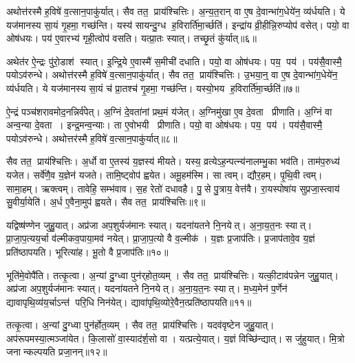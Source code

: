 अथोत्त॑रस्मै ह॒विषे॑ व॒त्सान॒पाकु॑र्यात्।
सैव तत॒ प्राय॑श्चित्तिः।
अ॒न्य॒त॒रान् वा ए॒ष दे॒वान्भा॑ग॒धेये॑न॒ व्य॑र्धयति।
ये यज॑मानस्य सा॒यं गृ॒हमा॒ गच्छ॑न्ति।
यस्य॑ सायन्दु॒ग्ध ह॒विरार्ति॑मा॒र्च्छति॑।
इन्द्रा॑य व्री॒हीन्नि॒रुप्योप॑ वसेत्।
पयो॒ वा ओष॑धयः।
पय॑ ए॒वारभ्य॑ गृही॒त्वोप॑ वसति।
यत्प्रा॒तः स्यात्।
तच्छृ॒तं कु॑र्यात्॥६॥

अथेत॑र ऐ॒न्द्रः पु॑रो॒डाश॑ स्यात्।
इ॒न्द्रि॒ये ए॒वास्मै॑ स॒मीची॑ दधाति।
पयो॒ वा ओष॑धयः।
पय॒ पय॑।
पय॑सै॒वास्मै॒ पयोऽव॑रुन्धे।
अथोत्त॑रस्मै ह॒विषे॑ व॒त्सान॒पाकु॑र्यात्।
सैव तत॒ प्राय॑श्चित्तिः।
उ॒भया॒न्॒ वा ए॒ष दे॒वान्भा॑ग॒धेये॑न॒ व्य॑र्धयति।
ये यज॑मानस्य सा॒यं च॑ प्रा॒तश्च॑ गृ॒हमा॒ गच्छ॑न्ति।
यस्यो॒भय ह॒विरार्ति॑मा॒र्च्छति॑॥७॥

ऐ॒न्द्रं पञ्च॑शरावमोद॒नन्निर्व॑पेत्।
अ॒ग्निं दे॒वता॑नां प्रथ॒मं य॑जेत्।
अ॒ग्निमु॑खा ए॒व दे॒वता प्रीणाति।
अ॒ग्निं वा अन्व॒न्या दे॒वता।
इन्द्र॒मन्व॒न्याः।
ता ए॒वोभयी प्रीणाति।
पयो॒ वा ओष॑धयः।
पय॒ पय॑।
पय॑सै॒वास्मै॒ पयोऽव॑रुन्धे।
अथोत्तर॑स्मै ह॒विषे॑ व॒त्सान॒पाकु॑र्यात्॥८॥

सैव तत॒ प्राय॑श्चित्तिः।
अ॒र्धो वा ए॒तस्य॑ य॒ज्ञस्य॑ मीयते।
यस्य॒ व्रत्येऽह॒न्पत्न्य॑नालम्भु॒का भव॑ति।
ताम॑प॒रुध्य॑ यजेत।
सर्वे॑णै॒व य॒ज्ञेन॑ यजते।
तामि॒ष्ट्वोप॑ ह्वयेत।
अमू॒हम॑स्मि।
सा त्वम्।
द्यौर॒हम्।
पृ॒थि॒वी त्वम्।
सामा॒हम्।
ऋक्त्वम्।
तावेहि॒ सम्भ॑वाव।
स॒ह रेतो॑ दधावहै।
पु॒से पु॒त्राय॒ वेत्त॑वै।
रा॒यस्पोषा॑य सुप्रजा॒स्त्वाय॑ सु॒वीर्या॒येति॑।
अ॒र्ध ए॒वैना॒मुप॑ ह्वयते।
सैव तत॒ प्राय॑श्चित्तिः॥९॥\anuvakamend[द॒धा॒ति॒ य॒ज्ञ उ॑त॒ एक॒न्धय॑न्ति रुन्धे कुर्यादा॒र्च्छत्य॒पाकु॑र्यात्पृथि॒वी त्वम॒ष्टौ च॑ (सर्वा॒न्॒ वि वै यदि॑ परस्त॒रामोष॑धीरन्यत॒रानु॒भया॑न॒र्धो वै ॥ )]

यद्विष्ष॑ण्णेन जुहु॒यात्।
अप्र॑जा अप॒शुर्यज॑मानः स्यात्।
यदना॑यतने नि॒नयेत्।
अ॒ना॒य॒त॒नः स्यात्।
प्रा॒जा॒प॒त्यय॒र्चा व॑ल्मीकव॒पाया॒मव॑ नयेत्।
प्रा॒जा॒प॒त्यो वै व॒ल्मीक॑।
य॒ज्ञः प्र॒जाप॑तिः।
प्र॒जाप॑तावे॒व य॒ज्ञं प्रति॑ष्ठापयति।
भूरित्या॑ह।
भू॒तो वै प्र॒जाप॑तिः॥१०॥

भूति॑मे॒वोपै॑ति।
तत्कृ॒त्वा।
अ॒न्यां दु॒ग्ध्वा पुन॑र्‌होत॒व्यम्।
सैव तत॒ प्राय॑श्चित्तिः।
यत्की॒टाव॑पन्नेन जुहु॒यात्।
अप्र॑जा अप॒शुर्यज॑मानः स्यात्।
यदना॑यतने नि॒नयेत्।
अ॒ना॒य॒त॒नः स्यात्।
म॒ध्य॒मेन॑ प॒र्णेन॑ द्यावापृथि॒व्य॑य॒र्चाऽन्त॑ परि॒धि निन॑येत्।
द्यावा॑पृथि॒व्योरे॒वैन॒त्प्रति॑ष्ठापयति॥११॥

तत्कृ॒त्वा।
अ॒न्यां दु॒ग्ध्वा पुन॑र्\mbox{}होत॒व्यम्।
सैव तत॒ प्राय॑श्चित्तिः।
यदव॑वृष्टेन जुहु॒यात्।
अप॑रूपमस्या॒त्मञ्जा॑येत।
कि॒लासो॑ वा॒स्याद॑र्\mbox{}श॒सो वा।
यत्प्रत्ये॒यात्।
य॒ज्ञं विच्छि॑न्द्यात्।
स जु॑हुयात्।
मि॒त्रो जनान्कल्पयति प्रजा॒नन्॥१२॥

